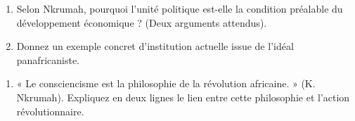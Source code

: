 \documentclass[11pt]{article}
\begin{document}
\begin{exercice}
\begin{enumerate}
    \item Selon Nkrumah, pourquoi l'unité politique est-elle la condition préalable du développement économique ? (Deux arguments attendus).
    \item Donnez un exemple concret d'institution actuelle issue de l'idéal panafricaniste.
\end{enumerate}
\end{exercice}

\begin{exercice}
\begin{enumerate}
    \item « Le consciencisme est la philosophie de la révolution africaine. » (K. Nkrumah). Expliquez en deux lignes le lien entre cette philosophie et l'action révolutionnaire.
\end{enumerate}
\end{exercice}
\end{document}

